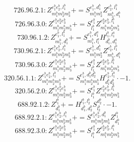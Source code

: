 \documentclass[letterpaper,10pt,fleqn,leqno,onecolumn]{article}
\begin{document}
\begin{equation} \;\;\;\;\;\;  726.96.2.1: Z^{e_{1}^{b}e_{2}^{b},l_{1}^{b}}_{m_{1}^{b}m_{2}^{b}m_{3}^{b}}+=S^{e_{1}^{b},d_{1}^{b}}_{m_{1}^{b}m_{2}^{b}}Z^{e_{2}^{b},l_{1}^{b}}_{m_{3}^{b},d_{1}^{b}} \end{equation}
\begin{equation} \;\;\;\;\;\;  726.96.3.0: Z^{e_{1}^{b}e_{2}^{b}e_{3}^{b}}_{m_{1}^{b}m_{2}^{b}m_{3}^{b}}+=S^{e_{1}^{b}}_{l_{1}^{b}}Z^{e_{2}^{b}e_{3}^{b},l_{1}^{b}}_{m_{1}^{b}m_{2}^{b}m_{3}^{b}} \end{equation}
\begin{equation} \;\;\;\;\;\;  730.96.1.2: Z^{e_{1}^{b},l_{1}^{b}}_{m_{1}^{b},d_{1}^{b}}+=S^{e_{1}^{b},d_{1}^{a}}_{m_{1}^{b},l_{1}^{a}}H^{l_{1}^{b},l_{1}^{a}}_{d_{1}^{b},d_{1}^{a}} \end{equation}
\begin{equation} \;\;\;\;\;\;  730.96.2.1: Z^{e_{1}^{b}e_{2}^{b},l_{1}^{b}}_{m_{1}^{b}m_{2}^{b}m_{3}^{b}}+=S^{e_{1}^{b},d_{1}^{b}}_{m_{1}^{b}m_{2}^{b}}Z^{e_{2}^{b},l_{1}^{b}}_{m_{3}^{b},d_{1}^{b}} \end{equation}
\begin{equation} \;\;\;\;\;\;  730.96.3.0: Z^{e_{1}^{b}e_{2}^{b}e_{3}^{b}}_{m_{1}^{b}m_{2}^{b}m_{3}^{b}}+=S^{e_{1}^{b}}_{l_{1}^{b}}Z^{e_{2}^{b}e_{3}^{b},l_{1}^{b}}_{m_{1}^{b}m_{2}^{b}m_{3}^{b}} \end{equation}
\begin{equation} \;\;\;\;\;\;  320.56.1.1: Z^{e_{1}^{b}e_{2}^{b},l_{1}^{b}}_{m_{1}^{b}m_{2}^{b}m_{3}^{b}}+=S^{e_{1}^{b},d_{1}^{b}d_{2}^{b}}_{m_{1}^{b}m_{2}^{b}m_{3}^{b}}H^{e_{2}^{b},l_{1}^{b}}_{d_{1}^{b}d_{2}^{b}}\cdot -1. \end{equation}
\begin{equation} \;\;\;\;\;\;  320.56.2.0: Z^{e_{1}^{b}e_{2}^{b}e_{3}^{b}}_{m_{1}^{b}m_{2}^{b}m_{3}^{b}}+=S^{e_{1}^{b}}_{l_{1}^{b}}Z^{e_{2}^{b}e_{3}^{b},l_{1}^{b}}_{m_{1}^{b}m_{2}^{b}m_{3}^{b}} \end{equation}
\begin{equation} \;\;\;\;\;\;  688.92.1.2: Z^{l_{1}^{b}}_{d_{1}^{b}}+=H^{l_{1}^{b},l_{2}^{b}}_{d_{1}^{b},d_{2}^{b}}S^{d_{2}^{b}}_{l_{2}^{b}}\cdot -1. \end{equation}
\begin{equation} \;\;\;\;\;\;  688.92.2.1: Z^{e_{1}^{b}e_{2}^{b},l_{1}^{b}}_{m_{1}^{b}m_{2}^{b}m_{3}^{b}}+=S^{e_{1}^{b}e_{2}^{b},d_{1}^{b}}_{m_{1}^{b}m_{2}^{b}m_{3}^{b}}Z^{l_{1}^{b}}_{d_{1}^{b}} \end{equation}
\begin{equation} \;\;\;\;\;\;  688.92.3.0: Z^{e_{1}^{b}e_{2}^{b}e_{3}^{b}}_{m_{1}^{b}m_{2}^{b}m_{3}^{b}}+=S^{e_{1}^{b}}_{l_{1}^{b}}Z^{e_{2}^{b}e_{3}^{b},l_{1}^{b}}_{m_{1}^{b}m_{2}^{b}m_{3}^{b}} \end{equation}
\end{document}
